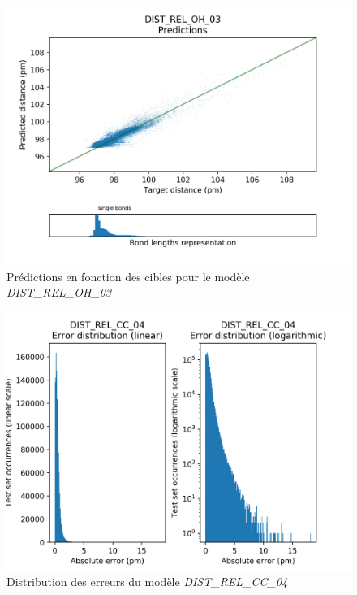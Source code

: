 \begin{figure}[!h]
	\centering
	
	\includegraphics[scale=0.8]{../figures/DIST_REL_OH_03/DIST_REL_OH_03_preds_targets.png}	
	
	\caption{Prédictions en fonction des cibles pour le modèle \emph{DIST\_REL\_OH\_03}}
	
\end{figure}



\begin{figure}[!h]
	\centering
	
	\includegraphics[scale=0.8]{../figures/DIST_REL_CC_04/DIST_REL_CC_04_distrib_rmse_val.png}	
	
	\caption{Distribution des erreurs du modèle \emph{DIST\_REL\_CC\_04}}
\end{figure}


